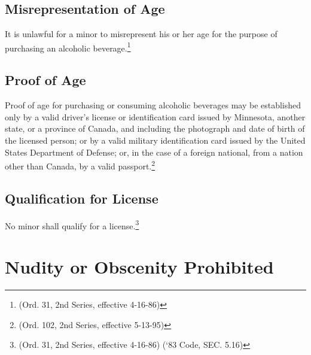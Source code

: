 \subsection{Misrepresentation of Age}
It is unlawful for a minor to misrepresent his or her age for the purpose of purchasing an alcoholic beverage.\footnote{(Ord. 31, 2nd Series, effective 4-16-86)}
\subsection{Proof of Age}
Proof of age for purchasing or consuming alcoholic beverages may be established only by a valid driver’s license or identification card issued by Minnesota, another state, or a province of Canada, and including the photograph and date of birth of the licensed person; or by a valid military identification card issued by the United States Department of Defense; or, in the case of a foreign national, from a nation other than Canada, by a valid passport.\footnote{(Ord. 102, 2nd Series, effective 5-13-95)}
\subsection{Qualification for License}
No minor shall qualify for a license.\footnote{(Ord. 31, 2nd Series, effective 4-16-86) (‘83 Code, SEC. 5.16)}

\section{Nudity or Obscenity Prohibited}
